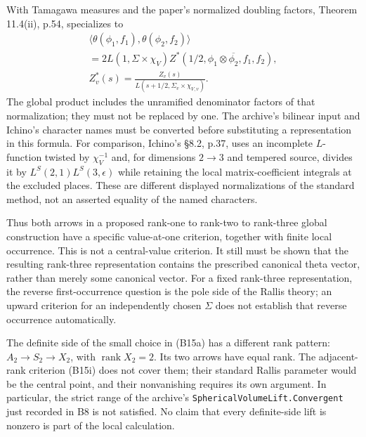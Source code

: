 \documentclass[11pt]{article}
\theoremstyle{definition}\newtheorem{definition}[theorem]{Definition}\newtheorem{remark}[theorem]{Remark}
\begin{document}
With Tamagawa measures and the paper's normalized doubling factors, Theorem 11.4(ii), p.54, specializes to
\begin{equation}
\begin{gathered}
 \langle\theta(\phi_1,f_1),\theta(\phi_2,f_2)\rangle
 \\
 =2L(1,\Sigma\times\chi_V)
       Z^*(1/2,\phi_1\otimes\overline{\phi_2},f_1,f_2),
 \\
 Z_v^*(s)=\frac{Z_v(s)}{L(s+1/2,\Sigma_v\times\chi_{V,v})}.
\end{gathered}
 \tag{B15j}
\end{equation}
The global product includes the unramified denominator factors of that normalization; they must not be replaced by one. The archive's bilinear input and Ichino's character names must be converted before substituting a representation in this formula. For comparison, Ichino's \S8.2, p.37, uses an incomplete $L$-function twisted by $\chi_V^{-1}$ and, for dimensions $2\to3$ and tempered source, divides it by $L^S(2,1)L^S(3,\epsilon)$ while retaining the local matrix-coefficient integrals at the excluded places. These are different displayed normalizations of the standard method, not an asserted equality of the named characters.

Thus both arrows in a proposed rank-one to rank-two to rank-three global construction have a specific value-at-one criterion, together with finite local occurrence. This is not a central-value criterion. It still must be shown that the resulting rank-three representation contains the prescribed canonical theta vector, rather than merely some canonical vector. For a fixed rank-three representation, the reverse first-occurrence question is the pole side of the Rallis theory; an upward criterion for an independently chosen $\Sigma$ does not establish that reverse occurrence automatically.

The definite side of the small choice in (B15a) has a different rank pattern: $A_2\to S_2\to X_2$, with $\operatorname{rank}X_2=2$. Its two arrows have equal rank. The adjacent-rank criterion (B15i) does not cover them; their standard Rallis parameter would be the central point, and their nonvanishing requires its own argument. In particular, the strict range of the archive's \nolinkurl{SphericalVolumeLift.Convergent} just recorded in B8 is not satisfied. No claim that every definite-side lift is nonzero is part of the local calculation.
\end{document}
